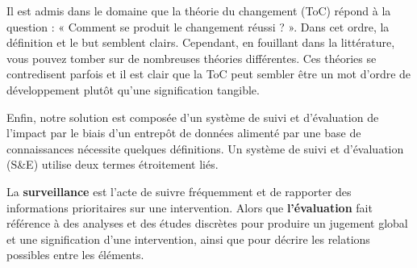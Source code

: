 Il est admis dans le domaine que la théorie du changement (ToC) répond à la question : « Comment se produit le changement réussi ? ». Dans cet ordre, la définition et le but semblent clairs. Cependant, en fouillant dans la littérature, vous pouvez tomber sur de nombreuses théories différentes. Ces théories se contredisent parfois et il est clair que la ToC peut sembler être un mot d'ordre de développement plutôt qu'une signification tangible\cite{stein_understanding_2012}. 

Enfin, notre solution est composée d'un système de suivi et d'évaluation de l'impact par le biais d'un entrepôt de données alimenté par une base de connaissances nécessite quelques définitions. Un système de suivi et d'évaluation (S\&E) utilise deux termes étroitement liés.

La \textbf{surveillance} est l'acte de suivre fréquemment et de rapporter des informations prioritaires sur une intervention. Alors que \textbf{l'évaluation} fait référence à des analyses et des études discrètes pour produire un jugement global et une signification d'une intervention, ainsi que pour décrire les relations possibles entre les éléments.